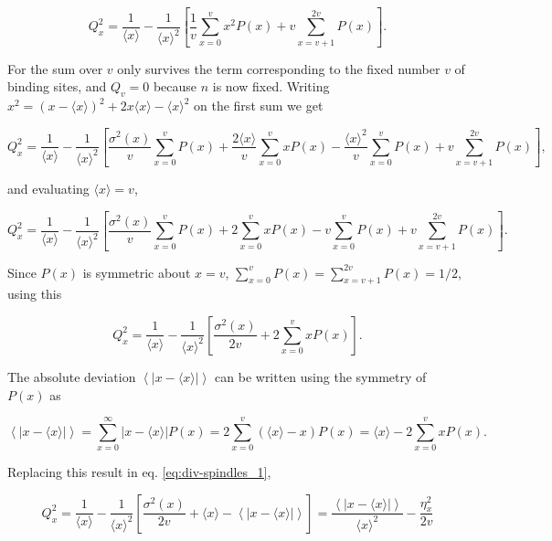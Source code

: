\begin{equation*}
  Q_x^2 = \frac{1}{\langle x\rangle} - \frac{1}{\langle x\rangle^2}\left[\frac{1}{v}\sum_{x=0}^vx^2P(x)+v\sum_{x=v+1}^{2v}P(x)\right].
\end{equation*}

For the sum over $v$ only survives the term corresponding to the fixed number $v$ of binding sites, and $Q_v=0$ because $n$ is now fixed. Writing $x^2 = \left(x-\langle x\rangle\right)^2 + 2x\langle x\rangle - \langle x\rangle^2$ on the first sum we get 

\begin{equation*}
  Q_x^2 = \frac{1}{\langle x\rangle}-\frac{1}{\langle x\rangle^2}\left[\frac{\sigma^2(x)}{v}\sum_{x=0}^vP(x)+\frac{2\langle x\rangle}{v}\sum_{x=0}^vxP(x)-\frac{\langle x\rangle^2}{v}\sum_{x=0}^vP(x)+v\sum_{x=v+1}^{2v}P(x)\right],
\end{equation*}

and evaluating $\langle x\rangle = v$,

\begin{equation*}
  Q_x^2 = \frac{1}{\langle x\rangle}-\frac{1}{\langle x\rangle^2}\left[\frac{\sigma^2(x)}{v}\sum_{x=0}^vP(x)+2\sum_{x=0}^vxP(x)-v\sum_{x=0}^vP(x)+v\sum_{x=v+1}^{2v}P(x)\right].
\end{equation*}

Since $P(x)$ is symmetric about $x=v$, $\sum_{x=0}^vP(x) = \sum_{x=v+1}^{2v}P(x) = 1/2$, using this

\begin{equation}
  \label{eq:div-spindles_1}
  Q_x^2 = \frac{1}{\langle x\rangle}-\frac{1}{\langle x\rangle^2}\left[\frac{\sigma^2(x)}{2v}+2\sum_{x=0}^vxP(x)\right].
\end{equation}

The absolute deviation $\left\langle\left|x-\langle x\rangle\right|\right\rangle$ can be written using the symmetry of $P(x)$ as

\begin{equation*}
  \left\langle\left|x-\langle x\rangle\right|\right\rangle = \sum_{x=0}^\infty\left|x-\langle x\rangle\right|P(x) = 2\sum_{x=0}^v\left(\langle x\rangle-x\right)P(x) = \langle x\rangle-2\sum_{x=0}^vxP(x).
\end{equation*}

Replacing this result in eq. \eqref{eq:div-spindles_1},

\begin{equation*}
  Q_x^2 = \frac{1}{\langle x\rangle}-\frac{1}{\langle x\rangle^2}\left[\frac{\sigma^2(x)}{2v}+\langle x\rangle-\left\langle\left|x-\langle x\rangle\right|\right\rangle\right] = \frac{\left\langle\left|x-\langle x\rangle\right|\right\rangle}{\langle x\rangle^2}-\frac{\eta_x^2}{2v}
\end{equation*}

